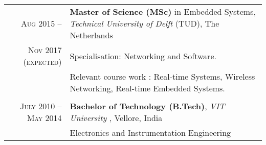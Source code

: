 %
%



\begin{tabular}{rl}	
	\textsc{Aug 2015 --}  			& \textbf{Master of Science (MSc)} in Embedded Systems, \emph{Technical University of Delft} (TUD), The Netherlands\\
	\textsc{Nov 2017 (expected)} 	&  Specialisation: Networking and Software. \\
									&  Relevant course work : Real-time Systems, Wireless Networking, Real-time Embedded Systems. \\ \\
	\textsc{July 2010 --May 2014} 	&  \textbf{Bachelor of Technology (B.Tech)},  \emph{VIT University} , Vellore, India\\
									& Electronics and Instrumentation Engineering \\ 
											
\end{tabular}